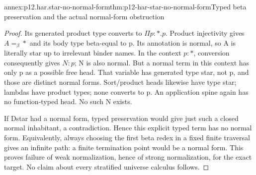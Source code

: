\begin{annexitem}{annex:p12.har.star-no-normal-form}{thm:p12-har-star-no-normal-form}{Typed beta preservation and the actual normal-form obstruction}
\begin{proof}
Its generated product type converts to \(\Pi p:\ast.p\).
Product injectivity gives \(A=_\beta\ast\) and its body type
beta-equal to p. Its annotation is normal, so A is literally star
up to irrelevant binder names. In the context \(p:\ast\),
conversion consequently gives \(N:p\); N is also normal.
But a normal term in this context has only p as a possible free head.
That variable has generated type star, not p, and those are distinct
normal forms. Sort/product heads likewise have type star; lambdas
have product types; none converts to p. An application spine again
has no function-typed head. No such N exists.

If Dstar had a normal form, typed preservation would give just such a
closed normal inhabitant, a contradiction. Hence this explicit typed
term has no normal form. Equivalently, always choosing the first beta
redex in a fixed finite traversal gives an infinite path: a finite
termination point would be a normal form. This proves failure of weak
normalization, hence of strong normalization, for the exact target.
No claim about every stratified universe calculus follows.
\end{proof}
\end{annexitem}
